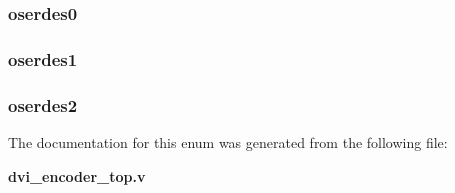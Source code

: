 \subsubsection[{serdes\-\_\-n\-\_\-to\-\_\-1}]{ {\bfseries \textcolor{vhdlchar}{oserdes0}\textcolor{vhdlchar}{ }} \hspace{0.3cm}}\label{enum1dvi__encoder__top_ae1603a589ded31051fb9bfe6579f923c}
\subsubsection[{serdes\-\_\-n\-\_\-to\-\_\-1}]{ {\bfseries \textcolor{vhdlchar}{oserdes1}\textcolor{vhdlchar}{ }} \hspace{0.3cm}}\label{enum1dvi__encoder__top_a49df49f392432b705e3c1efdfbe1d34b}
\subsubsection[{serdes\-\_\-n\-\_\-to\-\_\-1}]{ {\bfseries \textcolor{vhdlchar}{oserdes2}\textcolor{vhdlchar}{ }} \hspace{0.3cm}}\label{enum1dvi__encoder__top_a63c7dd14aa1a7f23c86cc2c071be1b62}


The documentation for this enum was generated from the following file\-:\begin{DoxyCompactItemize}
\item 
{\bf dvi\-\_\-encoder\-\_\-top.\-v}\end{DoxyCompactItemize}
